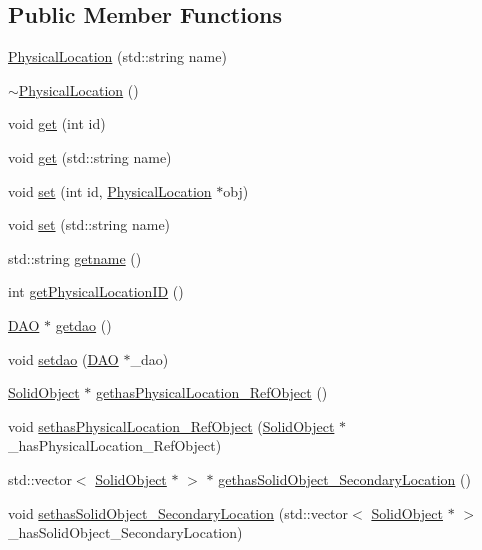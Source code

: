 \subsection*{Public Member Functions}
\begin{DoxyCompactItemize}
\item 
\hyperlink{class_physical_location_a760538a40999c01afd62316b5f0bac07}{PhysicalLocation} (std::string name)
\item 
\hyperlink{class_physical_location_a12cb8d645584b3b7a904b18af5335950}{$\sim$PhysicalLocation} ()
\item 
void \hyperlink{class_physical_location_addcfd9162a1ac9b8938e4718789095c6}{get} (int id)
\item 
void \hyperlink{class_physical_location_a9bfbbba56c605144b47b4e2655314681}{get} (std::string name)
\item 
void \hyperlink{class_physical_location_aaf2cdd609a052572dc86c02280071e0f}{set} (int id, \hyperlink{class_physical_location}{PhysicalLocation} $\ast$obj)
\item 
void \hyperlink{class_physical_location_a7d41ac762e3ea3bb544225ac0a774e2e}{set} (std::string name)
\item 
std::string \hyperlink{class_physical_location_a80fa2cb0593f5cb050e02f30d41e2fbe}{getname} ()
\item 
int \hyperlink{class_physical_location_a38e5755b8c2f289f9155f1daf0c400d2}{getPhysicalLocationID} ()
\item 
\hyperlink{class_d_a_o}{DAO} $\ast$ \hyperlink{class_physical_location_a69e1ec1ea1add99b2de138be01622374}{getdao} ()
\item 
void \hyperlink{class_physical_location_a22e72cd2fbf6d9b68192622961e8e4ce}{setdao} (\hyperlink{class_d_a_o}{DAO} $\ast$\_\-dao)
\item 
\hyperlink{class_solid_object}{SolidObject} $\ast$ \hyperlink{class_physical_location_a483c00149d7c907d35c9f39191ff14e6}{gethasPhysicalLocation\_\-RefObject} ()
\item 
void \hyperlink{class_physical_location_a2af8c39c6e813bb8efc7cc6baf9c9ed2}{sethasPhysicalLocation\_\-RefObject} (\hyperlink{class_solid_object}{SolidObject} $\ast$\_\-hasPhysicalLocation\_\-RefObject)
\item 
std::vector$<$ \hyperlink{class_solid_object}{SolidObject} $\ast$ $>$ $\ast$ \hyperlink{class_physical_location_ac5509fce6bb0f93c4cbdb6f2c400663d}{gethasSolidObject\_\-SecondaryLocation} ()
\item 
void \hyperlink{class_physical_location_a96849bb1527fe7135c75949db7885c5c}{sethasSolidObject\_\-SecondaryLocation} (std::vector$<$ \hyperlink{class_solid_object}{SolidObject} $\ast$ $>$ \_\-hasSolidObject\_\-SecondaryLocation)

\end{DoxyCompactItemize}
